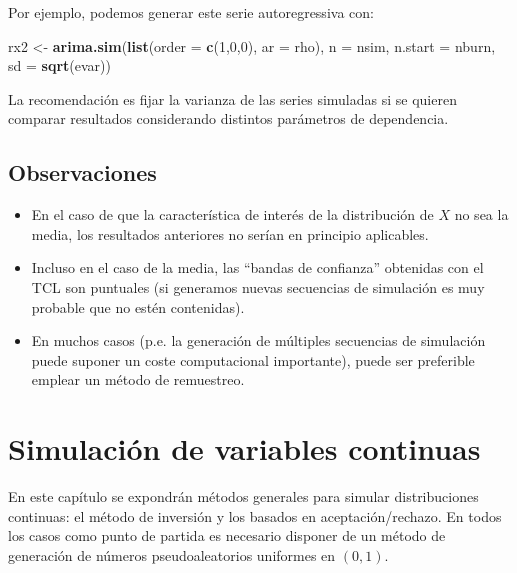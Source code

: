 \documentclass[
]{book}
\newenvironment{Shaded}{\begin{snugshade}}{\end{snugshade}}
\newcommand{\DataTypeTok}[1]{\textcolor[rgb]{0.13,0.29,0.53}{#1}}
\newcommand{\DecValTok}[1]{\textcolor[rgb]{0.00,0.00,0.81}{#1}}
\newcommand{\KeywordTok}[1]{\textcolor[rgb]{0.13,0.29,0.53}{\textbf{#1}}}
\newcommand{\NormalTok}[1]{#1}
\newcommand{\StringTok}[1]{\textcolor[rgb]{0.31,0.60,0.02}{#1}}
\theoremstyle{break}
\theoremstyle{definition}
\theoremstyle{definition}
\theoremstyle{definition}
\theoremstyle{remark}
\begin{document}
Por ejemplo, podemos generar este serie autoregressiva con:

\begin{Shaded}
\begin{Highlighting}[]
\NormalTok{rx2 <-}\StringTok{ }\KeywordTok{arima.sim}\NormalTok{(}\KeywordTok{list}\NormalTok{(}\DataTypeTok{order =} \KeywordTok{c}\NormalTok{(}\DecValTok{1}\NormalTok{,}\DecValTok{0}\NormalTok{,}\DecValTok{0}\NormalTok{), }\DataTypeTok{ar =}\NormalTok{ rho), }\DataTypeTok{n =}\NormalTok{ nsim, }\DataTypeTok{n.start =}\NormalTok{ nburn, }\DataTypeTok{sd =} \KeywordTok{sqrt}\NormalTok{(evar))}
\end{Highlighting}
\end{Shaded}

La recomendación es fijar la varianza de las series simuladas si se quieren comparar
resultados considerando distintos parámetros de dependencia.

\hypertarget{observaciones}{%
\section{Observaciones}\label{observaciones}}

\begin{itemize}
\item
  En el caso de que la característica de interés de la
  distribución de \(X\) no sea la media, los resultados anteriores
  no serían en principio aplicables.
\item
  Incluso en el caso de la media, las ``bandas de confianza''
  obtenidas con el TCL son puntuales (si generamos nuevas
  secuencias de simulación es muy probable que no
  estén contenidas).
\item
  En muchos casos (p.e. la generación de múltiples secuencias de
  simulación puede suponer un coste computacional importante),
  puede ser preferible emplear un método de remuestreo.
\end{itemize}

\hypertarget{sim-con}{%
\chapter{Simulación de variables continuas}\label{sim-con}}

En este capítulo se expondrán métodos generales para simular distribuciones continuas: el método de inversión y los basados en aceptación/rechazo.
En todos los casos como punto de partida es necesario
disponer de un método de generación de números pseudoaleatorios uniformes en \((0,1)\).
\end{document}
